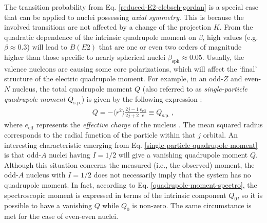 The transition probability from Eq. \eqref{reduced-E2-clebsch-gordan} is a special case that can be applied to nuclei possessing \emph{axial symmetry}. This is because the involved transitions are not affected by a change of the projection $K$.
From the quadratic dependence of the intrinsic quadrupole moment on $\beta$, high values (e.g. $\beta\approx 0.3$) will lead to $B(E2)$ that are one or even two orders of magnitude higher than those specific to nearly spherical nuclei $\beta_\text{sph}\approx 0.05$. Usually, the valence nucleons are causing some core polarizations, which will affect the `final' structure of the electric quadrupole moment. For example, in an odd-$Z$ and even-$N$ nucleus, the total quadrupole moment $Q$ (also referred to as \emph{single-particle quadrupole moment} $Q_\text{s.p.}$) is given by the following expression \cite{bertulani2007nuclear}:
\begin{align}
    Q=-\langle r^2\rangle\frac{2j-1}{2j+2}\frac{e_\text{eff}}{e}\equiv Q_\text{s.p.}\ ,
    \label{single-particle-quadrupole-moment}
\end{align}
where $e_\text{eff}$ represents the \emph{effective charge} of the nucleus \cite{heyde1994nuclear}. The mean squared radius corresponds to the radial function of the particle within that $j$ orbital. 
An interesting characteristic emerging from Eq. \eqref{single-particle-quadrupole-moment} is that odd-$A$ nuclei having $I=1/2$ will give a vanishing quadrupole moment $Q$. Although this situation concerns the measured (i.e., the observed) moment, the odd-$A$ nucleus with $I=1/2$ does not necessarily imply that the system has no quadrupole moment. In fact, according to Eq. \eqref{quadrupole-moment-spectro}, the spectroscopic moment is expressed in terms of the intrinsic component $Q_0$, so it is possible to have a vanishing $Q$ while $Q_0$ is non-zero. The same circumstance is met for the case of even-even nuclei.

